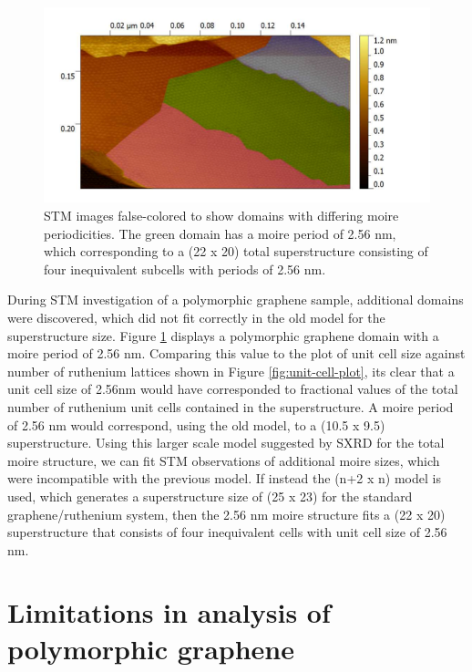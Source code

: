 \begin{figure}
  \centering
  \includegraphics[scale=0.72]{./figs/half-integer-structures.png}
  \caption{
  STM images false-colored to show domains with differing moire periodicities. The green domain has a moire period of 2.56 nm, which corresponding to a (22 x 20) total superstructure consisting of four inequivalent subcells with periods of 2.56 nm. 
  }
  \label{fig:moire25}
\end{figure} 

During STM investigation of a polymorphic graphene sample, additional domains were discovered, which did not fit correctly in the old model for the superstructure size. Figure \ref{fig:moire25} displays a polymorphic graphene domain with a moire period of 2.56 nm. Comparing this value to the plot of unit cell size against number of ruthenium lattices shown in Figure \ref{fig:unit-cell-plot}, its clear that a unit cell size of 2.56nm would have corresponded to fractional values of the total number of ruthenium unit cells contained in the superstructure. A moire period of 2.56 nm would correspond, using the old model, to a (10.5 x 9.5) superstructure. Using this larger scale model suggested by SXRD for the total moire structure, we can fit STM observations of additional moire sizes, which were incompatible with the previous model. If instead the (n+2 x n) model is used, which generates a superstructure size of (25 x 23) for the standard graphene/ruthenium system, then the 2.56 nm moire structure fits a (22 x 20) superstructure that consists of four inequivalent cells with unit cell size of 2.56 nm.

\section{Limitations in analysis of polymorphic graphene}

